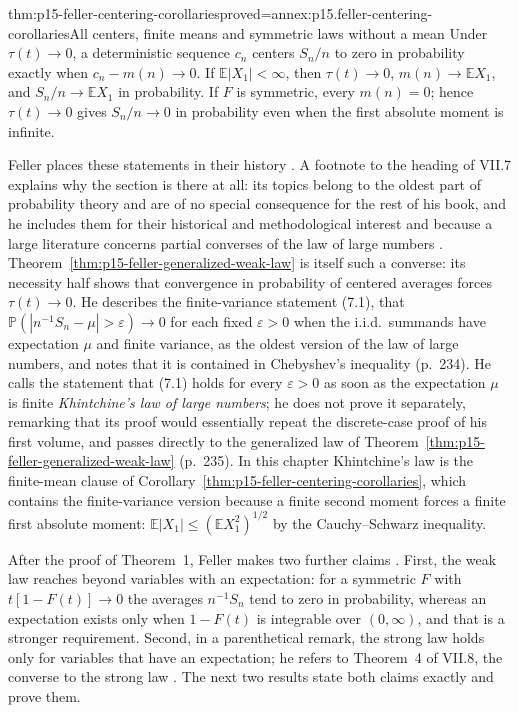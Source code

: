 \begin{hbcorollary}{thm:p15-feller-centering-corollaries}{proved=annex:p15.feller-centering-corollaries}{All centers, finite means and symmetric laws without a mean}
Under \(\tau(t)\to0\), a deterministic sequence \(c_n\) centers
\(S_n/n\) to zero in probability exactly when \(c_n-m(n)\to0\).
If \(\mathbb E|X_1|<\infty\), then
\(\tau(t)\to0\), \(m(n)\to\mathbb EX_1\), and
\(S_n/n\to\mathbb EX_1\) in probability.
If \(F\) is symmetric, every \(m(n)=0\); hence \(\tau(t)\to0\)
gives \(S_n/n\to0\) in probability even when the first absolute
moment is infinite.
\end{hbcorollary}

Feller places these statements in their history
\cite[VII.7, pp.~234--235]{Feller1971ProbabilityII}. A footnote to the
heading of VII.7 explains why the section is there at all: its topics
belong to the oldest part of probability theory and are of no special
consequence for the rest of his book, and he includes them for their
historical and methodological interest and because a large literature
concerns partial converses of the law of large numbers
\cite[VII.7, p.~234, footnote]{Feller1971ProbabilityII}.
Theorem~\ref{thm:p15-feller-generalized-weak-law} is itself such a
converse: its necessity half shows that convergence in probability of
centered averages forces \(\tau(t)\to0\). He describes the
finite-variance statement (7.1), that
\(\mathbb P(|n^{-1}S_n-\mu|>\varepsilon)\to0\) for each fixed
\(\varepsilon>0\) when the i.i.d.\ summands have expectation \(\mu\)
and finite variance, as the oldest version of the law of large
numbers, and notes that it is contained in Chebyshev's inequality
(p.~234). He calls the statement that (7.1) holds for every
\(\varepsilon>0\) as soon as the expectation \(\mu\) is finite
\emph{Khintchine's law of large numbers}; he does not prove it
separately, remarking that its proof would essentially repeat the
discrete-case proof of his first volume, and passes directly to the
generalized law of Theorem~\ref{thm:p15-feller-generalized-weak-law}
(p.~235). In this chapter Khintchine's law is the finite-mean clause of
Corollary~\ref{thm:p15-feller-centering-corollaries}, which contains the
finite-variance version because a finite second moment forces a finite
first absolute moment: \(\mathbb E|X_1|\leq(\mathbb EX_1^2)^{1/2}\) by
the Cauchy--Schwarz inequality.

After the proof of Theorem~1, Feller makes two further claims
\cite[VII.7, p.~236]{Feller1971ProbabilityII}. First, the weak law
reaches beyond variables with an expectation: for a symmetric \(F\) with
\(t[1-F(t)]\to0\) the averages \(n^{-1}S_n\) tend to zero in
probability, whereas an expectation exists only when \(1-F(t)\) is
integrable over \((0,\infty)\), and that is a stronger requirement.
Second, in a parenthetical remark, the strong law holds only for
variables that have an expectation; he refers to Theorem~4 of VII.8,
the converse to the strong law
\cite[VII.8, Theorem~4, p.~241]{Feller1971ProbabilityII}. The next two
results state both claims exactly and prove them.


